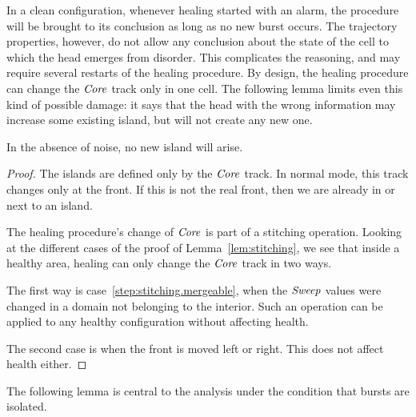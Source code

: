 \documentclass[11pt]{memoir}
\theoremstyle{definition} %
\newcommand{\fld}[1]{\ensuremath{\textit{#1\/}}}
\newcommand{\Core}{\fld{Core}}
\newcommand{\Sweep}{\fld{Sweep}}
\begin{document}
In a clean configuration, whenever healing started with an alarm, the procedure
will be brought to its conclusion as long as no new burst occurs.
The trajectory properties, however, do not allow any conclusion about the
state of the cell to which the head emerges from disorder.
This complicates the reasoning, and may require several restarts of the healing procedure.
By design, the healing procedure can change the \( \Core \) track only in one cell.
The following lemma limits even this kind of possible damage:
it says that the head with the wrong information may increase some existing island, but will
not create any new one.

\begin{lemma}
In the absence of noise, no new island will arise.
\end{lemma}
\begin{proof}
The islands are defined only by the \( \Core \) track.
In normal mode, this track changes only at the front.
If this is not the real front, then we are already in or next to an island.

The healing procedure's change of \( \Core \) is part of a stitching operation.
Looking at the different cases of the proof of Lemma~\ref{lem:stitching}, we see that 
inside a healthy area, healing can only change the \( \Core \) track in two ways.

The first way is case~\ref{step:stitching.mergeable}, when the \( \Sweep \) values were changed
in a domain not belonging to the interior.
Such an operation can be applied to any healthy configuration without affecting health.

The second case is when the front is moved left or right.
This does not affect health either.
\end{proof}

The following lemma is central to the analysis under the condition that bursts are isolated.
\end{document}
